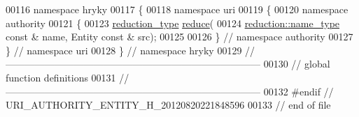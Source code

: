 \begin{DoxyCode}
00116 \textcolor{keyword}{namespace }hryky
00117 \{
00118 \textcolor{keyword}{namespace }uri
00119 \{
00120 \textcolor{keyword}{namespace }authority
00121 \{
00123     \hyperlink{namespacehryky_a343a9a4c36a586be5c2693156200eadc}{reduction_type} \hyperlink{namespacehryky_1_1uri_ab4530b241565d82fb0768bb29031858f}{reduce}(
00124         \hyperlink{namespacehryky_1_1reduction_ac686c30a4c8d196bbd0f05629a6b921f}{reduction::name_type} \textcolor{keyword}{const} & name, Entity \textcolor{keyword}{const} & src);
00125 
00126 \} \textcolor{comment}{// namespace authority}
00127 \} \textcolor{comment}{// namespace uri}
00128 \} \textcolor{comment}{// namespace hryky}
00129 \textcolor{comment}{//
      ------------------------------------------------------------------------------}
00130 \textcolor{comment}{// global function definitions}
00131 \textcolor{comment}{//
      ------------------------------------------------------------------------------}
00132 \textcolor{preprocessor}{#endif // URI\_AUTHORITY\_ENTITY\_H\_20120820221848596}
00133 \textcolor{preprocessor}{}\textcolor{comment}{// end of file}
\end{DoxyCode}
